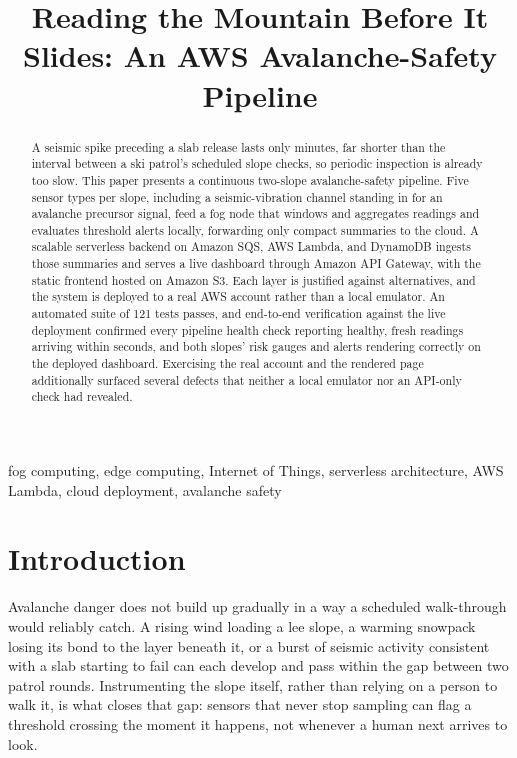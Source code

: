 \documentclass[conference]{IEEEtran}
\begin{document}
\title{Reading the Mountain Before It Slides: An AWS Avalanche-Safety Pipeline}

\author{
}

\maketitle

\begin{abstract}
A seismic spike preceding a slab release lasts only minutes, far shorter than the interval between a ski patrol's scheduled slope checks, so periodic inspection is already too slow. This paper presents a continuous two-slope avalanche-safety pipeline. Five sensor types per slope, including a seismic-vibration channel standing in for an avalanche precursor signal, feed a fog node that windows and aggregates readings and evaluates threshold alerts locally, forwarding only compact summaries to the cloud. A scalable serverless backend on Amazon SQS, AWS Lambda, and DynamoDB ingests those summaries and serves a live dashboard through Amazon API Gateway, with the static frontend hosted on Amazon S3. Each layer is justified against alternatives, and the system is deployed to a real AWS account rather than a local emulator. An automated suite of 121 tests passes, and end-to-end verification against the live deployment confirmed every pipeline health check reporting healthy, fresh readings arriving within seconds, and both slopes' risk gauges and alerts rendering correctly on the deployed dashboard. Exercising the real account and the rendered page additionally surfaced several defects that neither a local emulator nor an API-only check had revealed.
\end{abstract}

\begin{IEEEkeywords}
fog computing, edge computing, Internet of Things, serverless architecture, AWS Lambda, cloud deployment, avalanche safety
\end{IEEEkeywords}

\section{Introduction}
Avalanche danger does not build up gradually in a way a scheduled walk-through would reliably catch. A rising wind loading a lee slope, a warming snowpack losing its bond to the layer beneath it, or a burst of seismic activity consistent with a slab starting to fail can each develop and pass within the gap between two patrol rounds. Instrumenting the slope itself, rather than relying on a person to walk it, is what closes that gap: sensors that never stop sampling can flag a threshold crossing the moment it happens, not whenever a human next arrives to look.
\end{document}
